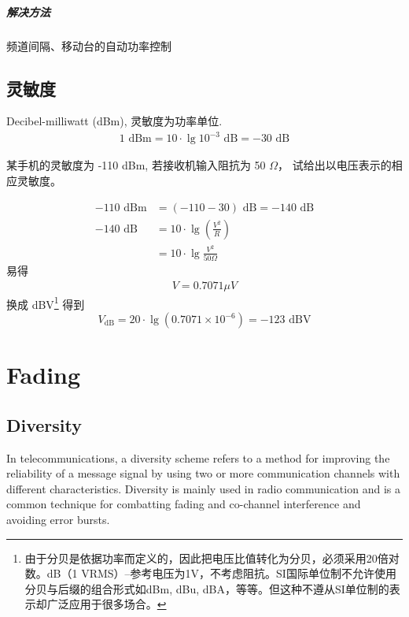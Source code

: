 \documentclass[a4paper]{report}
\begin{document}
\paragraph{解决方法}频道间隔、移动台的自动功率控制

\section{灵敏度}
Decibel-milliwatt (dBm), 灵敏度为功率单位. 
\begin{align*}
	1 \text{ dBm}= 10\cdot\lg{10^{-3}}\text{ dB}= -30\text{ dB}
\end{align*}

某手机的灵敏度为 -110 dBm, 若接收机输入阻抗为 50 $\Omega$， 试给出以电压表示的相应灵敏度。

\begin{align*}
	-110 \text{ dBm} &= (-110-30) \text{ dB} = -140 \text{ dB}\\
	-140 \text{ dB} &= 10\cdot \lg(\frac{V^2}{R}) \\
	&= 10\cdot \lg{\frac{V^2}{50\Omega}}
\end{align*}
易得
\begin{align*}
	V=0.7071 \mu V
\end{align*}
换成 dBV\footnote{由于分贝是依据功率而定义的，因此把电压比值转化为分贝，必须采用20倍对数。dB（1 VRMS）–参考电压为1V，不考虑阻抗。SI国际单位制不允许使用分贝与后缀的组合形式如dBm, dBu, dBA，等等。但这种不遵从SI单位制的表示却广泛应用于很多场合。} 得到
\begin{equation}
	V_{\text{dB}}=20\cdot\lg{(0.7071\times 10^{-6})}=-123\text{ dBV}
\end{equation}


\chapter{Fading}
\section{Diversity}
In telecommunications, a diversity scheme refers to a method for improving the reliability of a message signal by using two or more communication channels with different characteristics. Diversity is mainly used in radio communication and is a common technique for combatting fading and co-channel interference and avoiding error bursts. 
\end{document}
